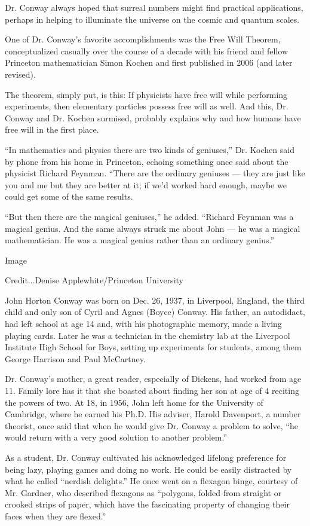 Dr. Conway always hoped that surreal numbers might find practical
applications, perhaps in helping to illuminate the universe on the
cosmic and quantum scales.

One of Dr. Conway's favorite accomplishments was the Free Will Theorem,
conceptualized casually over the course of a decade with his friend and
fellow Princeton mathematician Simon Kochen and first published in 2006
(and later revised).

The theorem, simply put, is this: If physicists have free will while
performing experiments, then elementary particles possess free will as
well. And this, Dr. Conway and Dr. Kochen surmised, probably explains
why and how humans have free will in the first place.

``In mathematics and physics there are two kinds of geniuses,'' Dr.
Kochen said by phone from his home in Princeton, echoing something once
said about the physicist Richard Feynman. ``There are the ordinary
geniuses --- they are just like you and me but they are better at it; if
we'd worked hard enough, maybe we could get some of the same results.

``But then there are the magical geniuses,'' he added. ``Richard Feynman
was a magical genius. And the same always struck me about John --- he
was a magical mathematician. He was a magical genius rather than an
ordinary genius.''

Image

Credit...Denise Applewhite/Princeton University

John Horton Conway was born on Dec. 26, 1937, in Liverpool, England, the
third child and only son of Cyril and Agnes (Boyce) Conway. His father,
an autodidact, had left school at age 14 and, with his photographic
memory, made a living playing cards. Later he was a technician in the
chemistry lab at the Liverpool Institute High School for Boys, setting
up experiments for students, among them George Harrison and Paul
McCartney.

Dr. Conway's mother, a great reader, especially of Dickens, had worked
from age 11. Family lore has it that she boasted about finding her son
at age of 4 reciting the powers of two. At 18, in 1956, John left home
for the University of Cambridge, where he earned his Ph.D. His adviser,
Harold Davenport, a number theorist, once said that when he would give
Dr. Conway a problem to solve, ``he would return with a very good
solution to another problem.''

As a student, Dr. Conway cultivated his acknowledged lifelong preference
for being lazy, playing games and doing no work. He could be easily
distracted by what he called ``nerdish delights.'' He once went on a
flexagon binge, courtesy of Mr. Gardner, who described flexagons as
``polygons, folded from straight or crooked strips of paper, which have
the fascinating property of changing their faces when they are flexed.''

